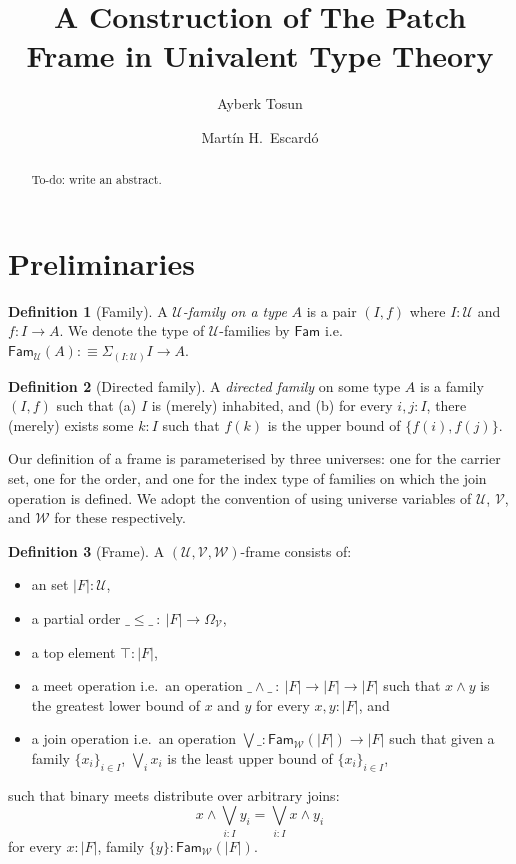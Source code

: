 \documentclass[a4paper, 11pt]{article}
\title{A Construction of The Patch Frame in Univalent Type Theory}
\author{Ayberk Tosun \and Mart\'{i}n H.\ Escard\'{o}}
\theoremstyle{definition}
\newtheorem{defn}{Definition}
\newcommand{\UU}{\mathcal{U}}
\newcommand{\VV}{\mathcal{V}}
\newcommand{\WW}{\mathcal{W}}
\newcommand{\Fam}[2]{\mathsf{Fam}_{#1}\left(#2\right)}
\newcommand{\define}[1]{\emph{#1}}
\newcommand{\todo}[1]{{\large\color{orange}\textsf{To-do: #1.}}}
\begin{document}
\maketitle

\begin{abstract}
  \todo{write an abstract}
\end{abstract}

\section{Preliminaries}

\begin{defn}[Family]
  A \define{$\UU$-family on a type} $A$ is a pair $(I, f)$ where $I : \UU$ and $f : I \rightarrow A$. We
  denote the type of $\UU$-families by $\mathsf{Fam}$ i.e.\ $\Fam{\UU}{A} :\equiv \Sigma_{(I : \UU)} I \rightarrow A$.
\end{defn}

\begin{defn}[Directed family]
  A \define{directed family} on some type $A$ is a family $(I, f)$ such that (a) $I$ is (merely)
  inhabited, and (b) for every $i, j : I$, there (merely) exists some $k : I$ such that $f(k)$ is
  the upper bound of $\{ f(i), f(j) \}$.
\end{defn}

Our definition of a frame is parameterised by three universes: one for the carrier set, one for the
order, and one for the index type of families on which the join operation is defined. We adopt the
convention of using universe variables of $\UU$, $\VV$, and $\WW$ for these respectively.

\begin{defn}[Frame]
  A $(\UU, \VV, \WW)$-frame consists of:
  \begin{itemize}
    \item an set $| F | : \UU$,
    \item a partial order $\_\le\_\ :\ | F | \rightarrow \Omega_\VV$,
    \item a top element $\top : | F |$,
    \item a meet operation i.e.\ an operation $\_\wedge\_\ :\ | F | \rightarrow | F | \rightarrow | F |$ such that $x \wedge y$ is
      the greatest lower bound of $x$ and $y$ for every $x, y : | F |$, and
    \item a join operation i.e.\ an operation $\bigvee\_ : \mathsf{Fam}_{\WW}(| F |) \rightarrow
      | F |$ such that given a family $\{ x_i \}_{i \in I}$, $\bigvee_i x_i$ is the least upper bound
      of $\{ x_i \}_{i \in I}$,
  \end{itemize}
  such that binary meets distribute over arbitrary joins:
  \begin{equation*}
    x \wedge \bigvee_{i : I} y_i = \bigvee_{i : I} x \wedge y_i
  \end{equation*}
  for every $x : | F |$, family $\{ y \} : \mathsf{Fam}_{\WW}(| F |)$.
\end{defn}
\end{document}
